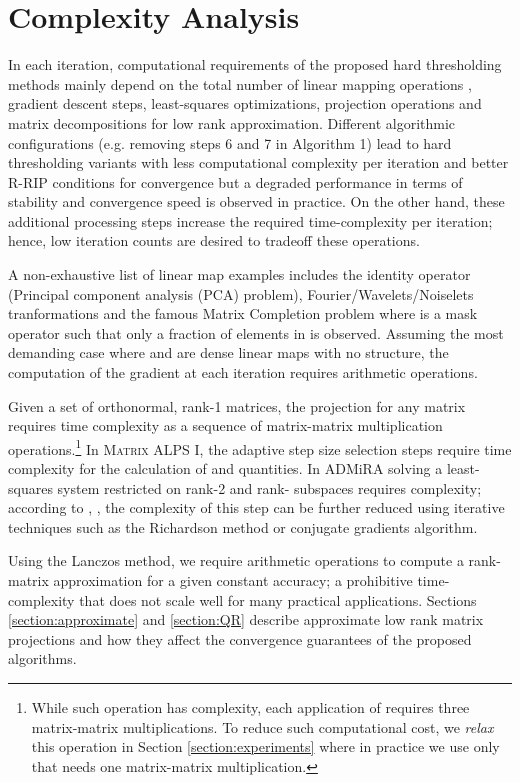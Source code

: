 \documentclass[twocolumn]{svjour3}
\begin{document}
\section{Complexity Analysis}{\label{section:complexity}}

In each iteration, computational requirements of the proposed hard thresholding methods mainly depend on the total number of linear mapping operations , gradient descent steps, least-squares optimizations, projection operations and matrix decompositions for low rank approximation. Different algorithmic configurations (e.g. removing steps 6 and 7 in Algorithm 1) lead to hard thresholding variants with less computational complexity per iteration and better R-RIP conditions for convergence but a degraded performance in terms of stability and convergence speed is observed in practice. On the other hand, these additional processing steps increase the required time-complexity per iteration; hence, low iteration counts are desired to tradeoff these operations. 

A non-exhaustive list of linear map examples includes the identity operator (Principal component analysis (PCA) problem), Fourier/Wavelets/Noiselets tranformations and the famous Matrix Completion problem where  is a mask operator such that only a fraction of elements in  is observed. Assuming the most demanding case where  and  are dense linear maps with no structure, the computation of the gradient  at each iteration requires  arithmetic operations. 

Given a set  of orthonormal, rank-1 matrices, the projection  for any matrix  requires time complexity   as a sequence of matrix-matrix multiplication operations.\footnote{While such operation has   complexity, each application of  requires three matrix-matrix multiplications. To reduce such computational cost, we {\it relax} this operation in Section \ref{section:experiments} where in practice we use only  that needs one matrix-matrix multiplication. } In \textsc{Matrix ALPS I}, the adaptive step size selection steps require  time complexity for the calculation of  and  quantities. In ADMiRA solving a least-squares system restricted on rank-2 and rank- subspaces requires  complexity; according to \cite{cosamp}, \cite{admira2010}, the complexity of this step can be further reduced using iterative techniques such as the Richardson method or conjugate gradients algorithm. 

Using the Lanczos method, we require  arithmetic operations to compute a rank- matrix approximation for a given constant accuracy; a prohibitive time-complexity that does not scale well for many practical applications. Sections \ref{section:approximate} and \ref{section:QR} describe approximate low rank matrix projections and how they affect the convergence guarantees of the proposed algorithms.
\end{document}
